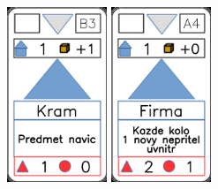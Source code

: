 \documentclass[a4paper]{article}
\begin{document}
	\includegraphics[width=3.0cm]{img-3_7}
	\includegraphics[width=3.0cm]{img-3_18}
\end{document}
